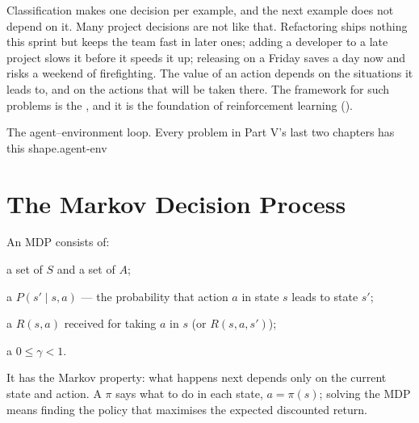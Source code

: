 Classification makes one decision per example, and the next example does not
depend on it. Many project decisions are not like that. Refactoring ships nothing
this sprint but keeps the team fast in later ones; adding a developer to a late
project slows it before it speeds it up; releasing on a Friday saves a day now and
risks a weekend of firefighting. The value of an action depends on the situations
it leads to, and on the actions that will be taken there. The framework for such
problems is the , and it is the foundation of
reinforcement learning ().

%
{The agent--environment loop. Every problem in Part V's last two chapters has this
shape.}{agent-env}

\section{The Markov Decision Process}

\begin{definitionbox}
An MDP consists of:
\begin{tight}
  \item a set of  $S$ and a set of  $A$;
  \item a  $P(s' \mid s, a)$ --- the probability that action
        $a$ in state $s$ leads to state $s'$;
  \item a  $R(s, a)$ received for taking $a$ in $s$ (or $R(s, a, s')$);
  \item a  $0 \le \gamma < 1$.
\end{tight}
It has the Markov property: what happens next depends only on the current state and
action. A  $\pi$ says what to do in each state, $a = \pi(s)$; solving the
MDP means finding the policy that maximises the expected discounted return.
\end{definitionbox}

